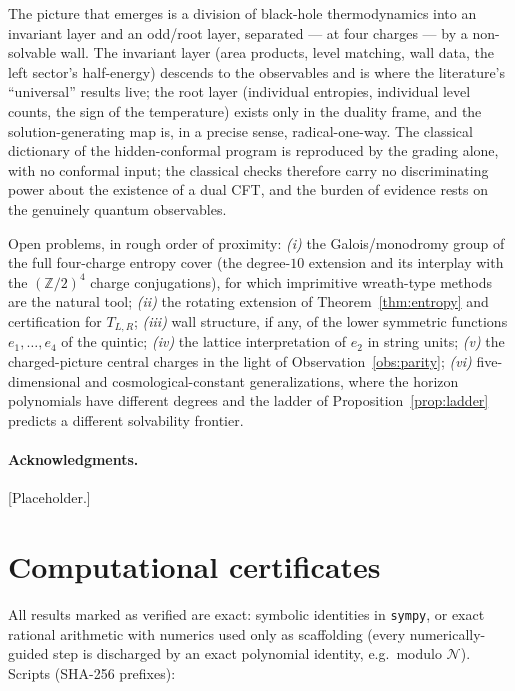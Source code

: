 \documentclass[11pt]{article}
\theoremstyle{definition}
\theoremstyle{remark}
\newcommand{\ZZ}{\mathbb{Z}}
\begin{document}
The picture that emerges is a division of black-hole thermodynamics into an
invariant layer and an odd/root layer, separated --- at four charges --- by a
non-solvable wall. The invariant layer (area products, level matching, wall
data, the left sector's half-energy) descends to the observables and is where
the literature's ``universal'' results live; the root layer (individual
entropies, individual level counts, the sign of the temperature) exists only
in the duality frame, and the solution-generating map is, in a precise sense,
radical-one-way. The classical dictionary of the hidden-conformal program is
reproduced by the grading alone, with no conformal input; the classical
checks therefore carry no discriminating power about the existence of a dual
CFT, and the burden of evidence rests on the genuinely quantum observables.

Open problems, in rough order of proximity: \emph{(i)} the Galois/monodromy
group of the full four-charge entropy cover (the degree-$10$ extension and its
interplay with the $(\ZZ/2)^4$ charge conjugations), for which imprimitive
wreath-type methods are the natural tool; \emph{(ii)} the rotating extension
of Theorem~\ref{thm:entropy} and certification for $T_{L,R}$; \emph{(iii)}
wall structure, if any, of the lower symmetric functions $e_1,\dots,e_4$ of
the quintic; \emph{(iv)} the lattice interpretation of $e_2$ in string units;
\emph{(v)} the charged-picture central charges in the light of
Observation~\ref{obs:parity}; \emph{(vi)} five-dimensional and
cosmological-constant generalizations, where the horizon polynomials have
different degrees and the ladder of Proposition~\ref{prop:ladder} predicts a
different solvability frontier.

\paragraph{Acknowledgments.}
[Placeholder.]

\appendix
\section{Computational certificates}
\label{app:certs}

All results marked as verified are exact: symbolic identities in
\texttt{sympy}, or exact rational arithmetic with numerics used only as
scaffolding (every numerically-guided step is discharged by an exact
polynomial identity, e.g.\ modulo $\mathcal N$). Scripts (SHA-256 prefixes):
\end{document}
